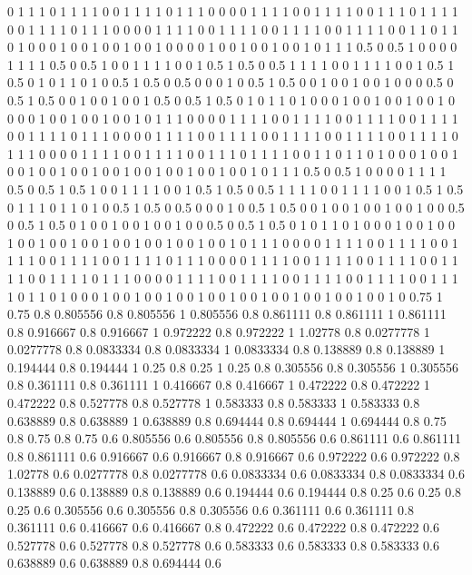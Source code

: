 0 1
1 1
0 1
1 1
1 0
0 1
1 1
1 0
1 1
1 0
0 0
0 1
1 1
1 0
0 1
1 1
1 0
0 1
1 1
0 1
1 1
1 0
0 1
1 1
1 0
1 1
1 0
0 0
0 1
1 1
1 0
0 1
1 1
1 0
0 1
1 1
1 0
0 1
1 1
1 0
0 1
1 0
1 1
0 1
0 0
0 1
0 0
1 0
0 1
0 0
1 0
0 0
0 1
0 0
1 0
0 1
0 0
1 0
1 1
1 0.5
0 0.5
1 0
0 0
0 1
1 1
1 0.5
0 0.5
1 0
0 1
1 1
1 0
0 1
0.5 1
0.5 0
0.5 1
1 1
1 0
0 1
1 1
1 0
0 1
0.5 1
0.5 0
1 0
1 1
0 1
0 0.5
1 0.5
0 0.5
0 0
0 1
0 0.5
1 0.5
0 0
1 0
0 1
0 0
1 0
0 0
0.5 0
0.5 1
0.5 0
0 1
0 0
1 0
0 1
0.5 0
0.5 1
0.5 0
1 0
1 1
0 1
0 0
0 1
0 0
1 0
0 1
0 0
1 0
0 0
0 1
0 0
1 0
0 1
0 0
1 0
1 1
1 0
0 0
0 1
1 1
1 0
0 1
1 1
1 0
0 1
1 1
1 0
0 1
1 1
1 0
0 1
1 1
1 0
1 1
1 0
0 0
0 1
1 1
1 0
0 1
1 1
1 0
0 1
1 1
1 0
0 1
1 1
1 0
0 1
1 1
1 0
1 1
1 0
0 0
0 1
1 1
1 0
0 1
1 1
1 0
0 1
1 1
0 1
1 1
1 0
0 1
1 0
1 1
0 1
0 0
0 1
0 0
1 0
0 1
0 0
1 0
0 1
0 0
1 0
0 1
0 0
1 0
0 1
0 0
1 0
1 1
1 0.5
0 0.5
1 0
0 0
0 1
1 1
1 0.5
0 0.5
1 0.5
1 0
0 1
1 1
1 0
0 1
0.5 1
0.5 0
0.5 1
1 1
1 0
0 1
1 1
1 0
0 1
0.5 1
0.5 0
1 1
1 0
1 1
0 1
0 0.5
1 0.5
0 0.5
0 0
0 1
0 0.5
1 0.5
0 0
1 0
0 1
0 0
1 0
0 1
0 0
0.5 0
0.5 1
0.5 0
1 0
0 1
0 0
1 0
0 1
0 0
0.5 0
0.5 1
0.5 0
1 0
1 1
0 1
0 0
0 1
0 0
1 0
0 1
0 0
1 0
0 1
0 0
1 0
0 1
0 0
1 0
0 1
0 0
1 0
1 1
1 0
0 0
0 1
1 1
1 0
0 1
1 1
1 0
0 1
1 1
1 0
0 1
1 1
1 0
0 1
1 1
1 0
1 1
1 0
0 0
0 1
1 1
1 0
0 1
1 1
1 0
0 1
1 1
1 0
0 1
1 1
1 0
0 1
1 1
1 0
1 1
1 0
0 0
0 1
1 1
1 0
0 1
1 1
1 0
0 1
1 1
1 0
0 1
1 1
1 0
0 1
1 1
1 0
1 1
0 1
0 0
0 1
0 0
1 0
0 1
0 0
1 0
0 1
0 0
1 0
0 1
0 0
1 0
0 1
0 0
1 0
0.75 1
0.75 0.8
0.805556 0.8
0.805556 1
0.805556 0.8
0.861111 0.8
0.861111 1
0.861111 0.8
0.916667 0.8
0.916667 1
0.972222 0.8
0.972222 1
1.02778 0.8
0.0277778 1
0.0277778 0.8
0.0833334 0.8
0.0833334 1
0.0833334 0.8
0.138889 0.8
0.138889 1
0.194444 0.8
0.194444 1
0.25 0.8
0.25 1
0.25 0.8
0.305556 0.8
0.305556 1
0.305556 0.8
0.361111 0.8
0.361111 1
0.416667 0.8
0.416667 1
0.472222 0.8
0.472222 1
0.472222 0.8
0.527778 0.8
0.527778 1
0.583333 0.8
0.583333 1
0.583333 0.8
0.638889 0.8
0.638889 1
0.638889 0.8
0.694444 0.8
0.694444 1
0.694444 0.8
0.75 0.8
0.75 0.8
0.75 0.6
0.805556 0.6
0.805556 0.8
0.805556 0.6
0.861111 0.6
0.861111 0.8
0.861111 0.6
0.916667 0.6
0.916667 0.8
0.916667 0.6
0.972222 0.6
0.972222 0.8
1.02778 0.6
0.0277778 0.8
0.0277778 0.6
0.0833334 0.6
0.0833334 0.8
0.0833334 0.6
0.138889 0.6
0.138889 0.8
0.138889 0.6
0.194444 0.6
0.194444 0.8
0.25 0.6
0.25 0.8
0.25 0.6
0.305556 0.6
0.305556 0.8
0.305556 0.6
0.361111 0.6
0.361111 0.8
0.361111 0.6
0.416667 0.6
0.416667 0.8
0.472222 0.6
0.472222 0.8
0.472222 0.6
0.527778 0.6
0.527778 0.8
0.527778 0.6
0.583333 0.6
0.583333 0.8
0.583333 0.6
0.638889 0.6
0.638889 0.8
0.694444 0.6
